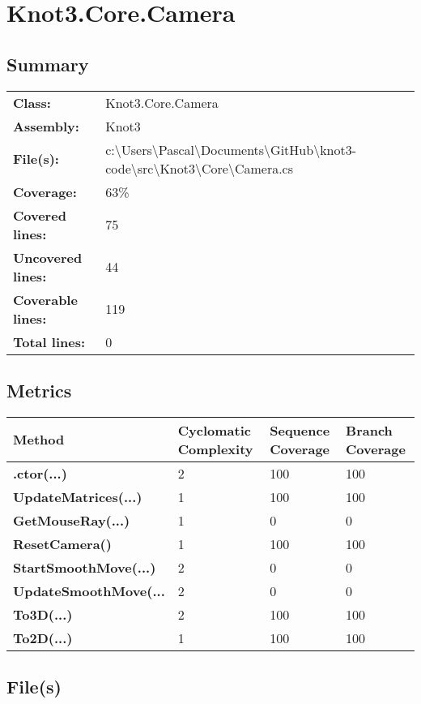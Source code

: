 \documentclass[a4paper,10pt]{article}
\begin{document}
\section{Knot3.Core.Camera}
\subsection{Summary}
\begin{longtable}[l]{ll}
\textbf{Class:} & Knot3.Core.Camera\\
\textbf{Assembly:} & Knot3\\
\textbf{File(s):} & \begin{minipage}[t]{12cm}{c:\textbackslash Users\textbackslash Pascal\textbackslash Documents\textbackslash GitHub\textbackslash knot3-code\textbackslash src\textbackslash Knot3\textbackslash Core\textbackslash Camera.cs}\end{minipage} \\
\textbf{Coverage:} & 63\%\\
\textbf{Covered lines:} & 75\\
\textbf{Uncovered lines:} & 44\\
\textbf{Coverable lines:} & 119\\
\textbf{Total lines:} & 0\\
\end{longtable}
\subsection{Metrics}
\begin{longtable}[l]{|l|l|l|l|}
\hline
\textbf{Method} & \textbf{Cyclomatic Complexity} & \textbf{Sequence Coverage} & \textbf{Branch Coverage}\\
\hline
\textbf{.ctor(...)} & 2 & 100 & 100\\
\hline
\textbf{UpdateMatrices(...)} & 1 & 100 & 100\\
\hline
\textbf{GetMouseRay(...)} & 1 & 0 & 0\\
\hline
\textbf{ResetCamera()} & 1 & 100 & 100\\
\hline
\textbf{StartSmoothMove(...)} & 2 & 0 & 0\\
\hline
\textbf{UpdateSmoothMove(...} & 2 & 0 & 0\\
\hline
\textbf{To3D(...)} & 2 & 100 & 100\\
\hline
\textbf{To2D(...)} & 1 & 100 & 100\\
\hline
\end{longtable}
\subsection{File(s)}
\end{document}
